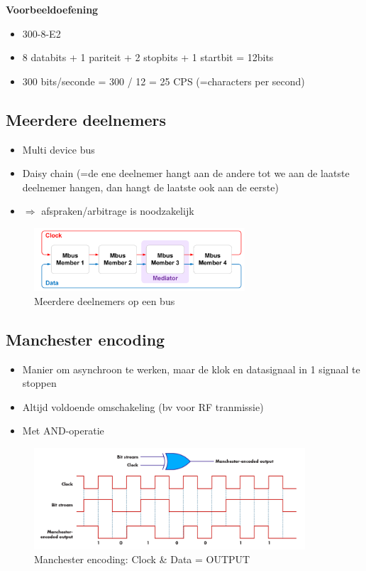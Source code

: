 \documentclass{article}
\newcommand{\bold}[1]{\textbf{#1}}
\begin{document}
\bold{Voorbeeldoefening}
\begin{itemize}
    \item 300-8-E2
    \item 8 databits + 1 pariteit + 2 stopbits + 1 startbit = 12bits
    \item 300 bits/seconde = 300 / 12 = 25 CPS (=characters per second)
\end{itemize}

\subsection{Meerdere deelnemers}
\begin{itemize}
    \item Multi device bus
    \item Daisy chain (=de ene deelnemer hangt aan de andere tot we aan de laatste deelnemer hangen, dan hangt de laatste ook aan de eerste)
    \item $\Rightarrow$ afspraken/arbitrage is noodzakelijk
\end{itemize}


\begin{figure}[H]
    \centering
    \includegraphics[width=0.7\textwidth]{Screenshot_20200323_122755.png}
    \caption{Meerdere deelnemers op een bus}
\end{figure}

\subsection{Manchester encoding}
\begin{itemize}
    \item Manier om asynchroon te werken, maar de klok en datasignaal in 1 signaal te stoppen
    \item Altijd voldoende omschakeling (bv voor RF tranmissie)
    \item Met AND-operatie
\end{itemize}

\begin{figure}[H]
    \centering
    \includegraphics[width=0.9\textwidth]{Screenshot_20200323_123031.png}
    \caption{Manchester encoding: Clock \& Data = OUTPUT}
\end{figure}
\end{document}
